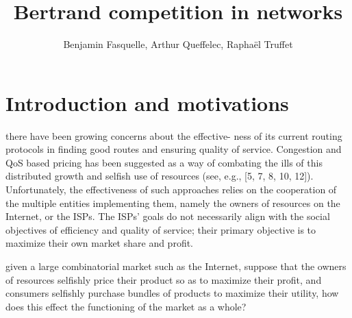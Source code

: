 \documentclass{beamer}
\title{Bertrand competition in networks}
\author{Benjamin Fasquelle, Arthur Queffelec, Raphaël Truffet}
\institute{École Normale Supérieure de Rennes, département Informatique et Télécommunications}
\begin{document}



  \begin{frame}
  \titlepage
  \end{frame}


\begin{frame}
  \tableofcontents
  \end{frame}


\section{Introduction and motivations}

\begin{frame}
there have been growing concerns about the effective-
ness of its current routing protocols in finding good routes and ensuring quality
of service. Congestion and QoS based pricing has been suggested as a way of
combating the ills of this distributed growth and selfish use of resources (see,
e.g., [5, 7, 8, 10, 12]). Unfortunately, the effectiveness of such approaches relies on
the cooperation of the multiple entities implementing them, namely the owners
of resources on the Internet, or the ISPs. The ISPs’ goals do not necessarily
align with the social objectives of efficiency and quality of service; their primary
objective is to maximize their own market share and profit.
\end{frame}



\begin{frame}
given a large combinatorial
market such as the Internet, suppose that the owners of resources selfishly price
their product so as to maximize their profit, and consumers selfishly purchase
bundles of products to maximize their utility, how does this effect the functioning
of the market as a whole?
\end{frame}
\end{document}
